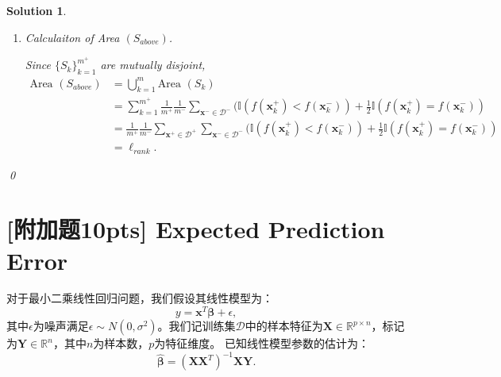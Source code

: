 \documentclass[a4paper,UTF8]{article}
\numberwithin{equation}{section}
\newtheorem*{mySol}{Solution}
\begin{document}
\begin{mySol}
\begin{enumerate}[(1)]
\begin{enumerate}[Step 1.]
If $\sum_{\mathbf{x}^- \in \mathcal{D}^-} \mathbb{I}(f(\mathbf{x}^+_k)=f(\mathbf{x}^-_k))=0$, which suggests no negative samples are ranked the same as $\mathbf{x}^+_k$, then $S_k$ is a trapezoid; otherwise, it is a rectangle.


In either way,
\begin{equation*}
\text{Area }( S_k) = \frac{1}{m^+} \frac{1}{m^-}\sum_{\mathbf{x}^- \in \mathcal{D}^-} (\mathbb{I}(f(\mathbf{x}^+_k)<f(\mathbf{x}^-_k)) +\frac{1}{2} \mathbb{I}(f(\mathbf{x}^+_k)=f(\mathbf{x}^-_k)).
\end{equation*}

\item Calculaiton of Area $(S_{above})$.

Since  $\{S_k\}_{k=1}^{m^+}$ are mutually disjoint,
\begin{equation*}
\begin{split}
\text{Area } (S_{above}) &= \bigcup_{k=1}^m \text{Area }(S_{k})
\\
&= \sum_{k=1}^{m^+}\frac{1}{m^+} \frac{1}{m^-}\sum_{\mathbf{x}^- \in \mathcal{D}^-}  (\mathbb{I}(f(\mathbf{x}^+_k)<f(\mathbf{x}^-_k)) +\frac{1}{2} \mathbb{I}(f(\mathbf{x}^+_k)=f(\mathbf{x}^-_k))
\\
&= \frac{1}{m^+} \frac{1}{m^-}\sum_{\mathbf{x}^+ \in \mathcal{D}^+}\sum_{\mathbf{x}^- \in \mathcal{D}^-} (\mathbb{I}(f(\mathbf{x}^+_k)<f(\mathbf{x}^-_k)) +\frac{1}{2} \mathbb{I}(f(\mathbf{x}^+_k)=f(\mathbf{x}^-_k))
\\
&=\ell_{rank}.
\end{split}
\end{equation*}
\end{enumerate}
\qed




\end{enumerate}
\end{mySol}

\newpage
\section{[附加题10pts] Expected Prediction Error}
对于最小二乘线性回归问题，我们假设其线性模型为：
\begin{equation}
	y=\textbf{x}^T  \bm{ \beta } + \epsilon , 
\end{equation}
其中$\epsilon$为噪声满足$\epsilon\sim N(0,\sigma^2)$。我们记训练集$\mathcal{D}$中的样本特征为$\textbf{X}\in \mathbb{R}^{p \times n}$，标记为$\textbf{Y}\in \mathbb{R}^{n}$，其中$n$为样本数，$p$为特征维度。
已知线性模型参数的估计为：
\begin{equation}
	\hat{\bm{\beta}}=(\textbf{X}\textbf{X}^T)^{-1}\textbf{X}\textbf{Y}.	
\end{equation}
\end{document}
